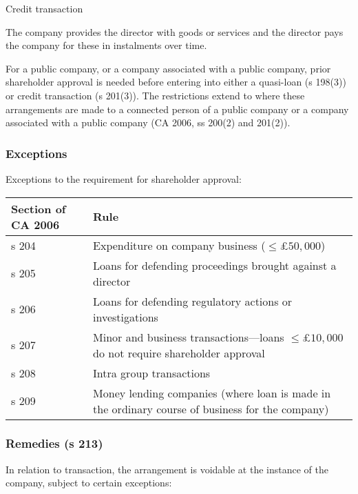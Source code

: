 \documentclass[
]{article}
\newenvironment{env-246868e5-1b14-46c9-8aed-b83e61569202}
{
    \savenotes\tcolorbox[blanker,breakable,left=5pt,borderline west={2pt}{-4pt}{yellow}]
}
{
    \endtcolorbox\spewnotes
}
\begin{document}
\begin{env-246868e5-1b14-46c9-8aed-b83e61569202}

Credit transaction

The company provides the director with goods or services and the
director pays the company for these in instalments over time.

\end{env-246868e5-1b14-46c9-8aed-b83e61569202}

For a public company, or a company associated with a public company,
prior shareholder approval is needed before entering into either a
quasi-loan (s 198(3)) or credit transaction (s 201(3)). The restrictions
extend to where these arrangements are made to a connected person of a
public company or a company associated with a public company (CA 2006,
ss 200(2) and 201(2)).

\hypertarget{exceptions-2}{%
\subsubsection{Exceptions}\label{exceptions-2}}

Exceptions to the requirement for shareholder approval:

\begin{longtable}[]{@{}ll@{}}
\toprule()
Section of CA 2006 & Rule \\
\midrule()
\endhead
s 204 & Expenditure on company business ({\(\leq \pounds 50,000\)}) \\
s 205 & Loans for defending proceedings brought against a director \\
s 206 & Loans for defending regulatory actions or investigations \\
s 207 & Minor and business transactions---loans
{\(\leq \pounds 10,000\)} do not require shareholder approval \\
s 208 & Intra group transactions \\
s 209 & Money lending companies (where loan is made in the ordinary
course of business for the company) \\
\bottomrule()
\end{longtable}

\hypertarget{remedies-s-213}{%
\subsubsection{Remedies (s 213)}\label{remedies-s-213}}

In relation to transaction, the arrangement is voidable at the instance
of the company, subject to certain exceptions:
\end{document}
